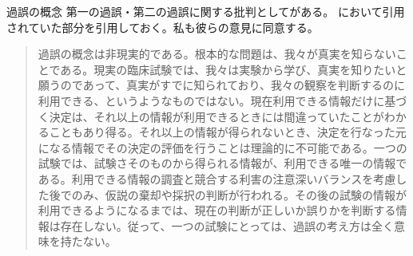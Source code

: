 \begin{SMbox}{過誤の概念}
第一の過誤・第二の過誤に関する批判として\cite{norleans2004臨床試験のための統計的方法}がある。
\cite{2010毒性試験に用いる統計解析法の動向}において引用されていた部分を引用しておく。私も彼らの意見に同意する。
\begin{quote}
過誤の概念は非現実的である。根本的な問題は、我々が真実を知らないことである。現実の臨床試験では、我々は実験から学び、真実を知りたいと願うのであって、真実がすでに知られており、我々の観察を判断するのに利用できる、というようなものではない。現在利用できる情報だけに基づく決定は、それ以上の情報が利用できるときには間違っていたことがわかることもあり得る。それ以上の情報が得られないとき、決定を行なった元になる情報でその決定の評価を行うことは理論的に不可能である。一つの試験では、試験さそのものから得られる情報が、利用できる唯一の情報である。利用できる情報の調査と競合する利害の注意深いバランスを考慮した後でのみ、仮説の棄却や採択の判断が行われる。その後の試験の情報が利用できるようになるまでは、現在の判断が正しいか誤りかを判断する情報は存在しない。従って、一つの試験にとっては、過誤の考え方は全く意味を持たない。
\end{quote}
\end{SMbox}


